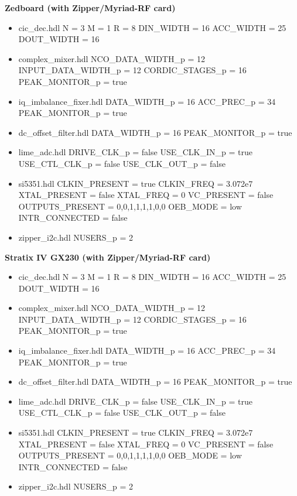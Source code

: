 \begin{minipage}[t]{.5\textwidth}
	\textbf{Zedboard (with Zipper/Myriad-RF card)}
	\begin{itemize}
		\item cic\_dec.hdl
			\subitem N = 3
			\subitem M = 1
			\subitem R = 8
			\subitem DIN\_WIDTH = 16
			\subitem ACC\_WIDTH = 25
			\subitem DOUT\_WIDTH = 16
		\item complex\_mixer.hdl
			\subitem NCO\_DATA\_WIDTH\_p = 12
			\subitem INPUT\_DATA\_WIDTH\_p = 12
			\subitem CORDIC\_STAGES\_p = 16
			\subitem PEAK\_MONITOR\_p = true
		\item iq\_imbalance\_fixer.hdl
			\subitem DATA\_WIDTH\_p = 16
			\subitem ACC\_PREC\_p = 34
			\subitem PEAK\_MONITOR\_p = true
		\item dc\_offset\_filter.hdl
			\subitem DATA\_WIDTH\_p = 16
			\subitem PEAK\_MONITOR\_p = true
		\item lime\_adc.hdl
			\subitem DRIVE\_CLK\_p = false
			\subitem USE\_CLK\_IN\_p = true
			\subitem USE\_CTL\_CLK\_p = false
			\subitem USE\_CLK\_OUT\_p = false
		\item si5351.hdl
			\subitem CLKIN\_PRESENT = true
			\subitem CLKIN\_FREQ = 3.072e7
			\subitem XTAL\_PRESENT = false
			\subitem XTAL\_FREQ = 0
			\subitem VC\_PRESENT = false
			\subitem OUTPUTS\_PRESENT = 0,0,1,1,1,1,0,0
			\subitem OEB\_MODE = low
			\subitem INTR\_CONNECTED = false
		\item zipper\_i2c.hdl
			\subitem NUSERS\_p = 2
	\end{itemize}
\end{minipage}
\begin{minipage}[t]{.5\textwidth}
	\textbf{Stratix IV GX230 (with Zipper/Myriad-RF card)}
	\begin{itemize}
		\item cic\_dec.hdl
			\subitem N = 3
			\subitem M = 1
			\subitem R = 8
			\subitem DIN\_WIDTH = 16
			\subitem ACC\_WIDTH = 25
			\subitem DOUT\_WIDTH = 16
		\item complex\_mixer.hdl
			\subitem NCO\_DATA\_WIDTH\_p = 12
			\subitem INPUT\_DATA\_WIDTH\_p = 12
			\subitem CORDIC\_STAGES\_p = 16
			\subitem PEAK\_MONITOR\_p = true
		\item iq\_imbalance\_fixer.hdl
			\subitem DATA\_WIDTH\_p = 16
			\subitem ACC\_PREC\_p = 34
			\subitem PEAK\_MONITOR\_p = true
		\item dc\_offset\_filter.hdl
			\subitem DATA\_WIDTH\_p = 16
			\subitem PEAK\_MONITOR\_p = true
		\item lime\_adc.hdl
			\subitem DRIVE\_CLK\_p = false
			\subitem USE\_CLK\_IN\_p = true
			\subitem USE\_CTL\_CLK\_p = false
			\subitem USE\_CLK\_OUT\_p = false
		\item si5351.hdl
			\subitem CLKIN\_PRESENT = true
			\subitem CLKIN\_FREQ = 3.072e7
			\subitem XTAL\_PRESENT = false
			\subitem XTAL\_FREQ = 0
			\subitem VC\_PRESENT = false
			\subitem OUTPUTS\_PRESENT = 0,0,1,1,1,1,0,0
			\subitem OEB\_MODE = low
			\subitem INTR\_CONNECTED = false
		\item zipper\_i2c.hdl
			\subitem NUSERS\_p = 2
	\end{itemize}
\end{minipage}

